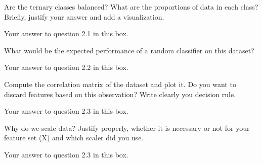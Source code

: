 
\begin{question}{2.1}
Are the ternary classes balanced? What are the proportions of data in each class? Briefly, justify your answer and add a visualization. 
\end{question}

\begin{answer}{11} 
    Your answer to question 2.1 in this box.
\end{answer}





\begin{question}{2.2}
What would be the expected performance of a random classifier on this dataset? 
\end{question}

\begin{answer}{3} 
    Your answer to question 2.2 in this box.
\end{answer}



\begin{question}{2.3}
Compute the correlation matrix of the dataset and plot it. Do you want to discard features based on this observation?
Write clearly you decision rule. 
\end{question}

\begin{answer}{19} 
    Your answer to question 2.3 in this box.
\end{answer}



\begin{question}{2.4}
 Why do we scale data? Justify properly, whether it is necessary or not for your feature set (X) and which scaler did you use. 
\end{question}

\begin{answer}{8} 
    Your answer to question 2.3 in this box.
\end{answer}

